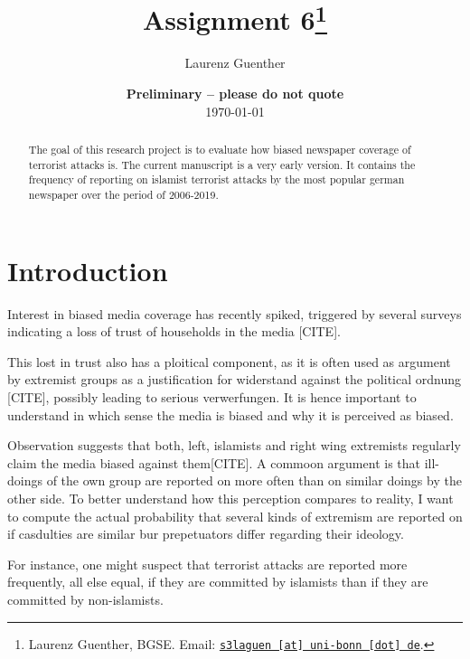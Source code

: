 \documentclass[11pt, a4paper, leqno]{article}
\begin{document}
	
	\title{Assignment 6\thanks{Laurenz Guenther, BGSE. Email: \href{mailto:s3laguen@uni-bonn.de}{\nolinkurl{s3laguen [at] uni-bonn [dot] de}}.}}
	
	\author{Laurenz Guenther}
	
	\date{
		{\bf Preliminary -- please do not quote} 
		\\[1ex] 
		\today
	}
	
	\maketitle
	
	
	\begin{abstract}
		The goal of this research project is to evaluate how biased newspaper coverage of terrorist attacks is. The current manuscript is a very early version. It contains the frequency of reporting on islamist terrorist attacks by the most popular german newspaper over the period of 2006-2019. 
	\end{abstract}
	\clearpage
	
	\section{Introduction} %
	\label{sec:introduction}



Interest in biased media coverage has recently spiked, triggered by several surveys indicating a loss of trust of households in the media [CITE]. 

This lost in trust also has a ploitical component, as it is often used as argument by extremist groups as a justification for widerstand against the political ordnung [CITE], possibly leading to serious verwerfungen. It is hence important to understand in which sense the media is biased and why it is perceived as biased.

Observation suggests that both, left, islamists and right wing extremists regularly claim the media biased against them[CITE]. A commoon argument is that ill-doings of the own group are reported on more often than on similar doings by the other side. To better understand how this perception compares to reality, I want to compute the actual probability that several kinds of extremism are reported on if casdulties are similar bur prepetuators differ regarding their ideology.



For instance, one might suspect that terrorist attacks are reported more frequently, all else equal, if they are committed by islamists than if they are committed by non-islamists. 
\end{document}
